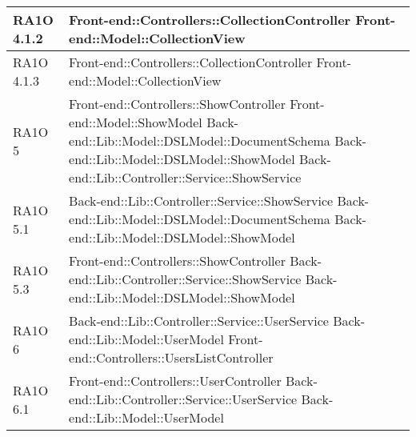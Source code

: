 \begin{center}
\begin{longtable}{ | p{3cm} | p{11cm} | }
	RA1O 4.1.2 & Front-end::Controllers::CollectionController \newline 
    Front-end::Model::CollectionView \newline  \\ \hline 
    
    RA1O 4.1.3 & Front-end::Controllers::CollectionController \newline 
    Front-end::Model::CollectionView \newline  \\ \hline 	
	         
    RA1O 5 & Front-end::Controllers::ShowController \newline
    			 Front-end::Model::ShowModel \newline
    			 Back-end::Lib::Model::DSLModel::DocumentSchema \newline
    			 Back-end::Lib::Model::DSLModel::ShowModel \newline
    			 Back-end::Lib::Controller::Service::ShowService \newline  \\ \hline   
    			  
    RA1O 5.1 & Back-end::Lib::Controller::Service::ShowService \newline
    			Back-end::Lib::Model::DSLModel::DocumentSchema \newline 
    			Back-end::Lib::Model::DSLModel::ShowModel \\ \hline
    			   
    RA1O 5.3 &
    			Front-end::Controllers::ShowController \newline
    			Back-end::Lib::Controller::Service::ShowService \newline
    			Back-end::Lib::Model::DSLModel::ShowModel \newline \\ \hline      
    
    RA1O 6 & Back-end::Lib::Controller::Service::UserService \newline  
    			Back-end::Lib::Model::UserModel \newline Front-end::Controllers::UsersListController  \\ \hline  
        
    RA1O 6.1 & Front-end::Controllers::UserController \newline Back-end::Lib::Controller::Service::UserService \newline Back-end::Lib::Model::UserModel \\ \hline   
       

\end{longtable}
\end{center}
